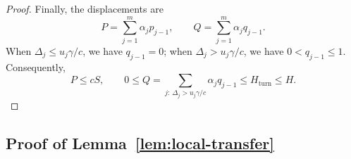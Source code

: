 \documentclass[11pt,letterpaper]{article}
\theoremstyle{definition}
\begin{document}
\begin{proof}
Finally, the displacements are
\begin{equation*}
  P=\sum_{j=1}^m\alpha_jp_{j-1},\qquad
  Q=\sum_{j=1}^m\alpha_jq_{j-1}.
\end{equation*}
When $\Delta_j\le u_j\gamma/c$, we have $q_{j-1}=0$; when $\Delta_j>u_j\gamma/c$, we have $0<q_{j-1}\le1$.
Consequently,
\begin{equation*}
  P\le cS,\qquad
  0\le Q
  =\sum_{j:\,\Delta_j>u_j\gamma/c}\alpha_jq_{j-1}
  \le H_{\mathrm{turn}}\le H.
\end{equation*}
\end{proof}

\subsection{Proof of Lemma~\ref{lem:local-transfer}}
\label{local:app-transfer}
\end{document}
